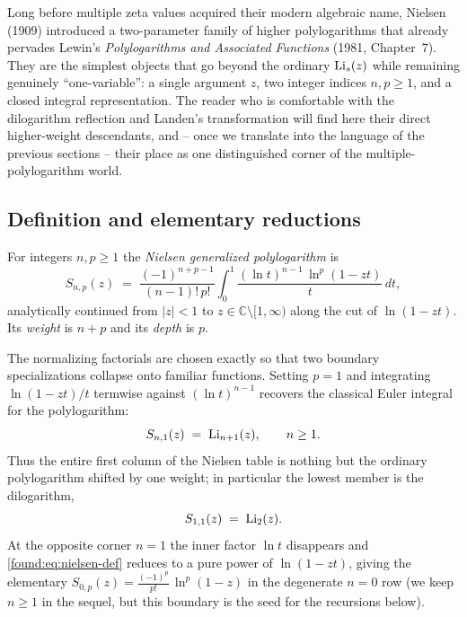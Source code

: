 Long before multiple zeta values acquired their modern algebraic name, Nielsen (1909) introduced a two-parameter family of higher polylogarithms that already pervades Lewin's \emph{Polylogarithms and Associated Functions} (1981, Chapter~7). They are the simplest objects that go beyond the ordinary $\operatorname{Li}_s(z)$ while remaining genuinely ``one-variable'': a single argument $z$, two integer indices $n,p\ge1$, and a closed integral representation. The reader who is comfortable with the dilogarithm reflection and Landen's transformation will find here their direct higher-weight descendants, and -- once we translate into the language of the previous sections -- their place as one distinguished corner of the multiple-polylogarithm world.

\subsection{Definition and elementary reductions}

\begin{definition}
For integers $n,p\ge1$ the \emph{Nielsen generalized polylogarithm} is
\begin{equation}\label{found:eq:nielsen-def}
  S_{n,p}(z)\;=\;\frac{(-1)^{n+p-1}}{(n-1)!\,p!}\int_0^1 \frac{(\ln t)^{n-1}\,\ln^{p}(1-zt)}{t}\,dt ,
\end{equation}
analytically continued from $|z|<1$ to $z\in\mathbb{C}\setminus[1,\infty)$ along the cut of $\ln(1-zt)$. Its \emph{weight} is $n+p$ and its \emph{depth} is $p$.
\end{definition}

The normalizing factorials are chosen exactly so that two boundary specializations collapse onto familiar functions. Setting $p=1$ and integrating $\ln(1-zt)/t$ termwise against $(\ln t)^{n-1}$ recovers the classical Euler integral for the polylogarithm:
\begin{equation}\label{found:eq:Snone}
  S_{n,1}(z)\;=\;\operatorname{Li}_{n+1}(z),\qquad n\ge1 .
\end{equation}
Thus the entire first column of the Nielsen table is nothing but the ordinary polylogarithm shifted by one weight; in particular the lowest member is the dilogarithm,
\begin{equation}\label{found:eq:S11}
  S_{1,1}(z)\;=\;\operatorname{Li}_2(z).
\end{equation}
At the opposite corner $n=1$ the inner factor $\ln t$ disappears and \eqref{found:eq:nielsen-def} reduces to a pure power of $\ln(1-zt)$, giving the elementary
$
  S_{0,p}(z) = \tfrac{(-1)^p}{p!}\,\ln^{p}(1-z)
$
in the degenerate $n=0$ row (we keep $n\ge1$ in the sequel, but this boundary is the seed for the recursions below).

